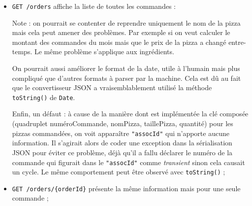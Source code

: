 \begin{itemize}
    \item \verb|GET /orders| affiche la liste de toutes les commandes :
\begin{jsoncode}
\end{jsoncode}

Note : on pourrait se contenter de reprendre uniquement le nom de la pizza mais cela peut amener
des problèmes. Par exemple si on veut calculer le montant des commandes du mois mais
que le prix de la pizza a changé entre-temps. Le même problème s'applique aux ingrédients.

On pourrait aussi améliorer le format de la date, utile à l'humain mais plus compliqué que d'autres
formats à parser par la machine. Cela est dû au fait que le convertisseur JSON a vraisemblablement utilisé
la méthode \verb|toString()| de \verb|Date|.

Enfin, un défaut : à cause de la manière dont est implémentée la clé composée 
(quadruplet numéroCommande, nomPizza, taillePizza, quantité) 
pour les pizzas commandées, on voit apparaître \verb|"assocId"| qui n'apporte aucune information.
Il s'agirait alors de coder une exception dans la sérialisation JSON pour éviter ce problème, déjà
qu'il a fallu déclarer le numéro de la commande qui figurait dans le \verb|"assocId"| comme \emph{transient}
sinon cela causait un cycle. Le même comportement peut être observé avec \verb|toString()| ;

    \item \verb|GET /orders/{orderId}| présente la même information mais pour une seule commande ;


\end{itemize}
